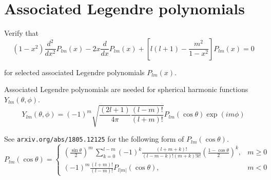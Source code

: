 

\section*{Associated Legendre polynomials}

Verify that
\begin{equation*}
(1-x^2)\frac{d^2}{dx^2}P_{lm}(x)-2x\frac{d}{dx}P_{lm}(x)+\left[l(l+1)-\frac{m^2}{1-x^2}\right]P_{lm}(x)=0
\tag{1}
\end{equation*}

for selected associated Legendre polynomials $P_{lm}(x)$.

\bigskip
Associated Legendre polynomials are needed for spherical harmonic functions $Y_{lm}(\theta,\phi)$.
\begin{equation*}
Y_{lm}(\theta,\phi)=(-1)^m\sqrt{\frac{(2l+1)}{4\pi}\frac{(l-m)!}{(l+m)!}}
P_{lm}(\cos\theta)\exp(im\phi)
\end{equation*}

See \verb$arxiv.org/abs/1805.12125$ for the following form of $P_{lm}(\cos\theta)$.
\begin{equation*}
P_{lm}(\cos\theta)=\begin{cases}\displaystyle
\left(\frac{\sin\theta}{2}\right)^m\,\sum_{k=0}^{l-m}
(-1)^k\frac{(l+m+k)!}{(l-m-k)!(m+k)!k!}
\left(\frac{1-\cos\theta}{2}\right)^k, & m\ge0
\\[4ex]
\displaystyle(-1)^m\frac{(l+m)!}{(l-m)!}P_{l|m|}(\cos\theta), & m<0
\end{cases}
\end{equation*}


